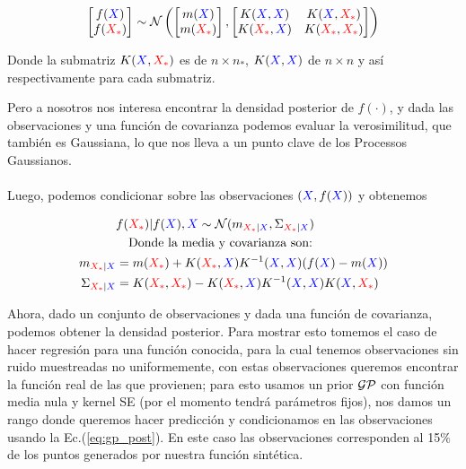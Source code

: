 \begin{align}
	\begin{bmatrix} f(\textcolor{blue}{X}) \\ f(\textcolor{red}{X_*})  \end{bmatrix}
	\sim \mathcal{N} \left(
	\begin{bmatrix} m(\textcolor{blue}{X}) \\ m(\textcolor{red}{X_*})  \end{bmatrix}, 
	\begin{bmatrix}
		K(\textcolor{blue}{X}, \textcolor{blue}{X}) & K(\textcolor{blue}{X}, \textcolor{red}{X_*}) \\ K(\textcolor{red}{X_*}, \textcolor{blue}{X}) & K(\textcolor{red}{X_*}, \textcolor{red}{X_*})
	\end{bmatrix}
	 \right)
\end{align}

Donde la submatriz $K(\textcolor{blue}{X}, \textcolor{red}{X_*})$ es de $n \times n_*$, $K(\textcolor{blue}{X}, \textcolor{blue}{X})$ de $n \times n$ y así respectivamente para cada submatriz.

Pero a nosotros nos interesa encontrar la densidad posterior de $f(\cdot)$, y dada las observaciones y una función de covarianza podemos evaluar la verosimilitud, que también es Gaussiana, lo que nos lleva a un punto clave de los Processos Gaussianos.\\

\\

Luego, podemos condicionar sobre las observaciones $(\textcolor{blue}{X}, f(\textcolor{blue}{X}))$ y obtenemos

\begin{align}
	& f(\textcolor{red}{X_*})|f(\textcolor{blue}{X}), \textcolor{blue}{X}  \sim \mathcal{N}(m_{\textcolor{red}{X_*}|\textcolor{blue}{X}}, \Sigma_{\textcolor{red}{X_*}|\textcolor{blue}{X}})\\ \label{eq:gp_post}
	& \quad \text{Donde la media y covarianza son:} \nonumber \\
	m_{\textcolor{red}{X_*}|\textcolor{blue}{X}} & = m(\textcolor{red}{X_*}) + K(\textcolor{red}{X_*}, \textcolor{blue}{X})K^{-1}(\textcolor{blue}{X}, \textcolor{blue}{X}) (f(\textcolor{blue}{X}) - m(\textcolor{blue}{X}))\\
	 \Sigma_{\textcolor{red}{X_*}|\textcolor{blue}{X}} & = K(\textcolor{red}{X_*}, \textcolor{red}{X_*}) - K(\textcolor{red}{X_*}, \textcolor{blue}{X})K^{-1}(\textcolor{blue}{X}, \textcolor{blue}{X}) K(\textcolor{blue}{X}, \textcolor{red}{X_*})
\end{align}


Ahora, dado un conjunto de observaciones y dada una función de covarianza, podemos obtener la densidad posterior. Para mostrar esto tomemos el caso de hacer regresión para una función conocida, para la cual tenemos observaciones sin ruido muestreadas no uniformemente, con estas observaciones queremos encontrar la función real de las que provienen; para esto usamos un prior $\mathcal{GP}$ con función media nula y kernel SE (por el momento tendrá parámetros fijos), nos damos un rango donde queremos hacer predicción y condicionamos en las observaciones usando la Ec.(\ref{eq:gp_post}). En este caso las observaciones corresponden al 15$\%$ de los puntos generados por nuestra función sintética.\\

